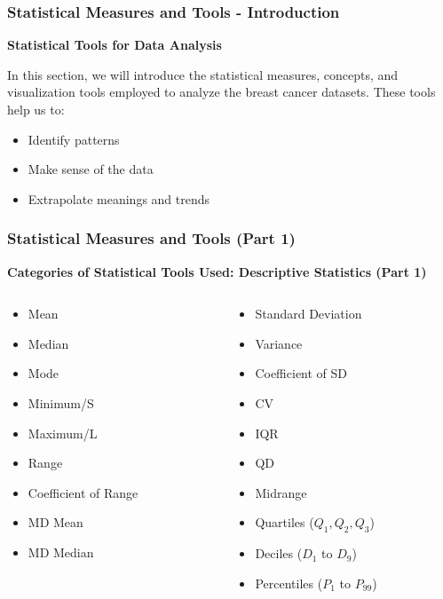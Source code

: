 \begin{frame}
    \frametitle{Statistical Measures and Tools - Introduction}
    \textbf{Statistical Tools for Data Analysis}

    In this section, we will introduce the statistical measures, concepts, and visualization tools employed to analyze the breast cancer datasets. These tools help us to:
    \vspace{1em}
    \begin{itemize}
        \item Identify patterns
        \item Make sense of the data
        \item Extrapolate meanings and trends
    \end{itemize}
\end{frame}

\begin{frame}
    \frametitle{Statistical Measures and Tools (Part 1)}
    \textbf{Categories of Statistical Tools Used: Descriptive Statistics (Part 1)}
    \begin{columns}
        \begin{column}{0.5\textwidth}
            \begin{itemize}
                \item Mean
                \item Median
                \item Mode
                \item Minimum/S
                \item Maximum/L
                \item Range
                \item Coefficient of Range
                \item MD Mean
                \item MD Median
            \end{itemize}
        \end{column}
        \begin{column}{0.5\textwidth}
            \begin{itemize}
                \item Standard Deviation
                \item Variance
                \item Coefficient of SD
                \item CV
                \item IQR
                \item QD
                \item Midrange
                \item Quartiles ($Q_1, Q_2, Q_3$)
                \item Deciles ($D_1$ to $D_9$)
                \item Percentiles ($P_1$ to $P_{99}$)
            \end{itemize}
        \end{column}
    \end{columns}
\end{frame}

